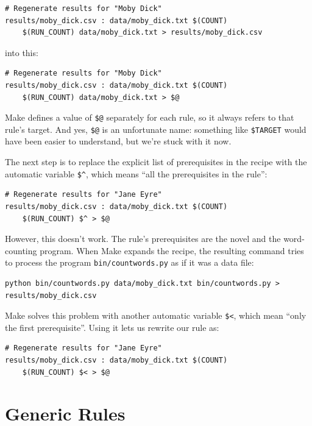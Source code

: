 \documentclass[
]{krantz}
\begin{document}
\begin{verbatim}
# Regenerate results for "Moby Dick"
results/moby_dick.csv : data/moby_dick.txt $(COUNT)
    $(RUN_COUNT) data/moby_dick.txt > results/moby_dick.csv
\end{verbatim}

into this:

\begin{verbatim}
# Regenerate results for "Moby Dick"
results/moby_dick.csv : data/moby_dick.txt $(COUNT)
    $(RUN_COUNT) data/moby_dick.txt > $@
\end{verbatim}

Make defines a value of \texttt{\$@} separately for each rule,
so it always refers to that rule's target.
And yes,
\texttt{\$@} is an unfortunate name:
something like \texttt{\$TARGET} would have been easier to understand,
but we're stuck with it now.

The next step is to replace the explicit list of prerequisites in the recipe
with the automatic variable \texttt{\$\^{}},
which means ``all the prerequisites in the rule'':

\begin{verbatim}
# Regenerate results for "Jane Eyre"
results/moby_dick.csv : data/moby_dick.txt $(COUNT)
    $(RUN_COUNT) $^ > $@
\end{verbatim}

However,
this doesn't work.
The rule's prerequisites are the novel and the word-counting program.
When Make expands the recipe,
the resulting command tries to process the program \texttt{bin/countwords.py}
as if it was a data file:

\begin{verbatim}
python bin/countwords.py data/moby_dick.txt bin/countwords.py > results/moby_dick.csv
\end{verbatim}

Make solves this problem with another automatic variable \texttt{\$\textless{}},
which mean ``only the first prerequisite''.
Using it lets us rewrite our rule as:

\begin{verbatim}
# Regenerate results for "Jane Eyre"
results/moby_dick.csv : data/moby_dick.txt $(COUNT)
    $(RUN_COUNT) $< > $@
\end{verbatim}

\hypertarget{automate-pattern}{%
\section{Generic Rules}\label{automate-pattern}}
\end{document}
